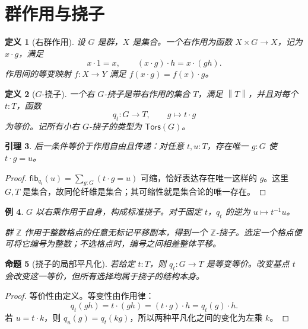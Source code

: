 \documentclass[12pt,oneside,openany,fontset=none]{ctexbook}
\theoremstyle{cn}
\newtheorem{definition}{定义}[chapter]
\newtheorem{example}[definition]{例}
\newtheorem{lemma}[definition]{引理}
\newtheorem{proposition}[definition]{命题}
\numberwithin{equation}{chapter}
\newcommand{\fib}{\mathsf{fib}}
\newcommand{\Tors}{\mathsf{Tors}}
\newcommand{\Z}{\mathbb Z}
\newcommand{\trunc}[1]{\left\|#1\right\|}
\begin{document}
\section{群作用与挠子}
\begin{definition}[右群作用]
设 $G$ 是群，$X$ 是集合。一个右作用为函数 $X\times G\to X$，记为 $x\cdot g$，满足
\[
x\cdot1=x,
\qquad
(x\cdot g)\cdot h=x\cdot(gh).
\]
作用间的等变映射 $f:X\to Y$ 满足 $f(x\cdot g)=f(x)\cdot g$。
\end{definition}
\begin{definition}[$G$-挠子]
一个右 $G$-挠子是带右作用的集合 $T$，满足 $\trunc T$，并且对每个 $t:T$，函数
\[
q_t:G\to T,\qquad g\longmapsto t\cdot g
\]
为等价。记所有小右 $G$-挠子的类型为 $\Tors(G)$。
\end{definition}
\begin{lemma}
后一条件等价于作用自由且传递：对任意 $t,u:T$，存在唯一 $g:G$ 使 $t\cdot g=u$。
\end{lemma}
\begin{proof}
$\fib_{q_t}(u)=\sum_{g:G}(t\cdot g=u)$ 可缩，恰好表达存在唯一这样的 $g$。这里 $G,T$ 是集合，故同伦纤维是集合；其可缩性就是集合论的唯一存在。
\end{proof}
\begin{example}
$G$ 以右乘作用于自身，构成标准挠子。对于固定 $t$，$q_t$ 的逆为 $u\mapsto t^{-1}u$。

群 $\Z$ 作用于整数格点的任意无标记平移副本，得到一个 $\Z$-挠子。选定一个格点便可将它编号为整数；不选格点时，编号之间相差整体平移。
\end{example}
\begin{proposition}[挠子的局部平凡化]
若给定 $t:T$，则 $q_t:G\to T$ 是等变等价。改变基点 $t$ 会改变这一等价，但所有选择均属于挠子的结构本身。
\end{proposition}
\begin{proof}
等价性由定义。等变性由作用律：
\[
q_t(gh)=t\cdot(gh)=(t\cdot g)\cdot h=q_t(g)\cdot h.
\]
若 $u=t\cdot k$，则 $q_u(g)=q_t(kg)$，所以两种平凡化之间的变化为左乘 $k$。
\end{proof}
\end{document}
